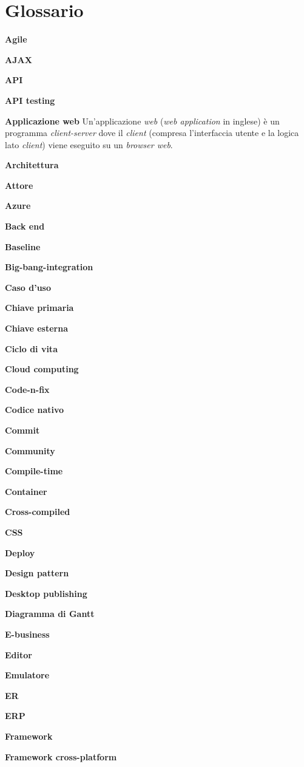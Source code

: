 \chapter{Glossario} \label{gloss}

\textbf{Agile}

\textbf{AJAX}

\textbf{API}

\textbf{API testing}

\textbf{Applicazione web} Un'applicazione \textit{web} (\textit{web application} in inglese) è un programma \textit{client-server} dove il \textit{client} (compresa l'interfaccia utente e la logica lato \textit{client}) viene eseguito su un \textit{browser web}.

\textbf{Architettura}

\textbf{Attore}

\textbf{Azure}

\textbf{Back end}

\textbf{Baseline}

\textbf{Big-bang-integration}

\textbf{Caso d'uso}

\textbf{Chiave primaria}

\textbf{Chiave esterna}

\textbf{Ciclo di vita}

\textbf{Cloud computing}

\textbf{Code-n-fix}

\textbf{Codice nativo}

\textbf{Commit}

\textbf{Community}

\textbf{Compile-time}

\textbf{Container}

\textbf{Cross-compiled}

\textbf{CSS}

\textbf{Deploy}

\textbf{Design pattern}

\textbf{Desktop publishing}

\textbf{Diagramma di Gantt}

\textbf{E-business}

\textbf{Editor}

\textbf{Emulatore}

\textbf{ER}

\textbf{ERP}

\textbf{Framework}

\textbf{Framework cross-platform}

